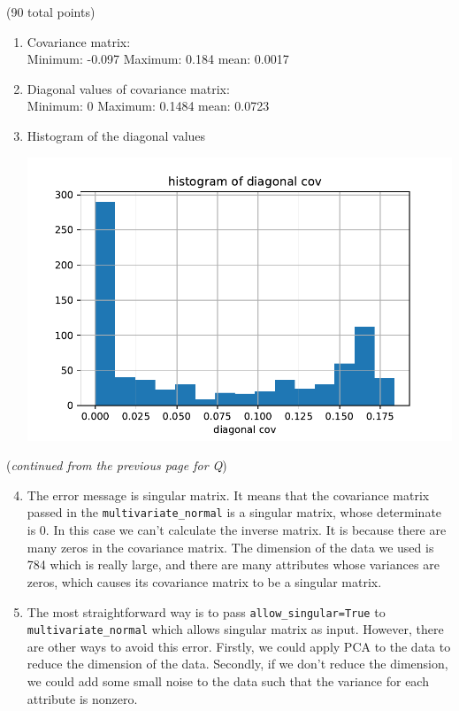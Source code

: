 \documentclass[12pt]{article}
\begin{document}
\begin{question}{(90 total points) \qTwoTitle}
\begin{subquestion}
  \begin{answerbox}{0.65\textheight}
    \begin{enumerate}
    \item Covariance matrix: \\
    Minimum: -0.097 Maximum: 0.184 mean: 0.0017
    \item Diagonal values of covariance matrix: \\
    Minimum: 0 Maximum:  0.1484 mean: 0.0723
    \item Histogram of the diagonal values
        \begin{center}
        \includegraphics[scale=1]{hist_cov.pdf}
        \end{center}
    \end{enumerate}
  \end{answerbox}
  \clearpage
  ({\it continued from the previous page for Q\label{q2:gaussian-1}})
  \begin{answerbox}{0.5\textheight}
    \begin{enumerate}\setcounter{enumi}{3}
    \item The error message is singular matrix. It means that the covariance matrix passed in the {\tt multivariate\_normal} is a singular matrix, whose determinate is 0. In this case we can't calculate the inverse matrix. It is because there are many zeros in the covariance matrix. The dimension of the data we used is 784 which is really large, and there are many attributes whose variances are zeros, which causes its covariance matrix to be a singular matrix.
    \item The most straightforward way is to pass {\tt allow\_singular=True} to {\tt multivariate\_normal} which allows singular matrix as input. However, there are other ways to avoid this error. Firstly, we could apply PCA to the data to reduce the dimension of the data. Secondly, if we don't reduce the dimension, we could add some small noise to the data such that the variance for each attribute is nonzero.
    \end{enumerate}
  \end{answerbox}


\end{subquestion}
\end{question}
\end{document}
